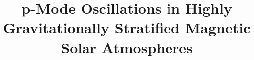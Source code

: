 \documentclass{aastex62}
\begin{document}
\title{p-Mode Oscillations in Highly Gravitationally Stratified Magnetic Solar Atmospheres}


\end{document}
